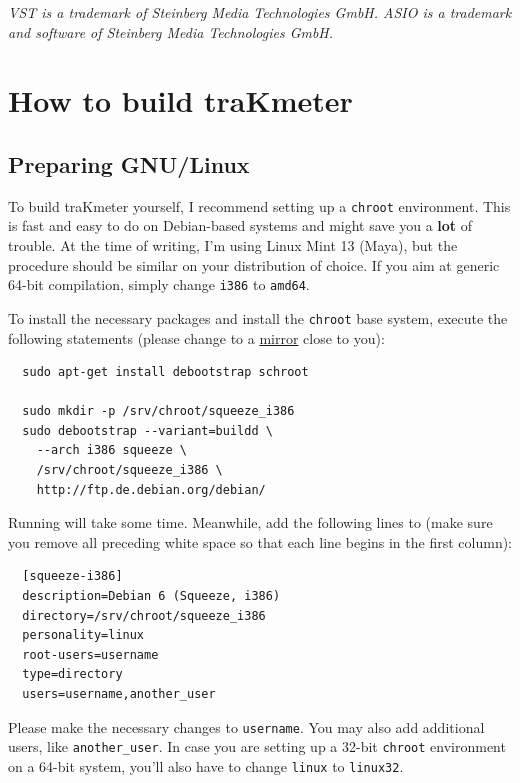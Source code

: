 \emph{VST is a trademark of Steinberg Media Technologies GmbH.  ASIO
  is a trademark and software of Steinberg Media Technologies GmbH.}

\appendix

\chapter{How to build traKmeter}
\label{chap:build_trakmeter}

\section{Preparing GNU/Linux}

To build traKmeter yourself, I recommend setting up a \texttt{chroot}
environment.  This is fast and easy to do on Debian-based systems and
might save you a \textbf{lot} of trouble.  At the time of writing, I'm
using Linux Mint 13 (Maya), but the procedure should be similar on
your distribution of choice.  If you aim at generic \num{64}-bit
compilation, simply change \texttt{i386} to \texttt{amd64}.

To install the necessary packages and install the \texttt{chroot} base
system, execute the following statements (please change
 to a
\href{http://www.debian.org/mirror/list}{mirror} close to you):

\begin{verbatim}
  sudo apt-get install debootstrap schroot

  sudo mkdir -p /srv/chroot/squeeze_i386
  sudo debootstrap --variant=buildd \
    --arch i386 squeeze \
    /srv/chroot/squeeze_i386 \
    http://ftp.de.debian.org/debian/
\end{verbatim}

Running  will take some time.  Meanwhile, add the
following lines to  (make sure you
remove all preceding white space so that each line begins in the first
column):

\begin{verbatim}
  [squeeze-i386]
  description=Debian 6 (Squeeze, i386)
  directory=/srv/chroot/squeeze_i386
  personality=linux
  root-users=username
  type=directory
  users=username,another_user
\end{verbatim}

Please make the necessary changes to \texttt{username}.  You may also
add additional users, like \texttt{another\_user}.  In case you are
setting up a \num{32}-bit \texttt{chroot} environment on a
\num{64}-bit system, you'll also have to change \texttt{linux} to
\texttt{linux32}.

